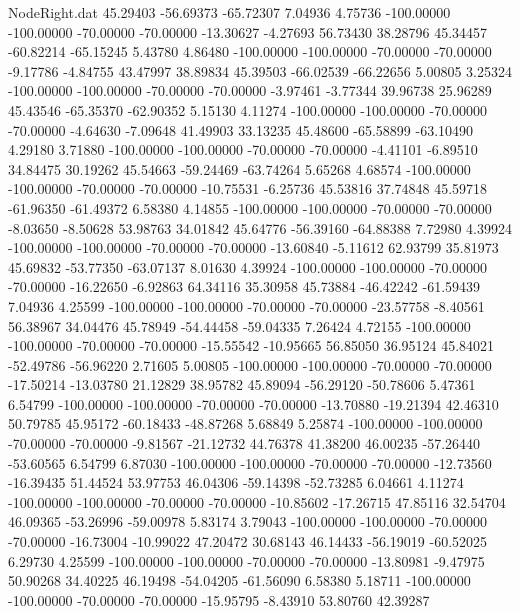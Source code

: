\begin{filecontents}{NodeRight.dat}
  45.29403  -56.69373  -65.72307     7.04936    4.75736 -100.00000 -100.00000  -70.00000  -70.00000  -13.30627   -4.27693   56.73430   38.28796
  45.34457  -60.82214  -65.15245     5.43780    4.86480 -100.00000 -100.00000  -70.00000  -70.00000   -9.17786   -4.84755   43.47997   38.89834
  45.39503  -66.02539  -66.22656     5.00805    3.25324 -100.00000 -100.00000  -70.00000  -70.00000   -3.97461   -3.77344   39.96738   25.96289
  45.43546  -65.35370  -62.90352     5.15130    4.11274 -100.00000 -100.00000  -70.00000  -70.00000   -4.64630   -7.09648   41.49903   33.13235
  45.48600  -65.58899  -63.10490     4.29180    3.71880 -100.00000 -100.00000  -70.00000  -70.00000   -4.41101   -6.89510   34.84475   30.19262
  45.54663  -59.24469  -63.74264     5.65268    4.68574 -100.00000 -100.00000  -70.00000  -70.00000  -10.75531   -6.25736   45.53816   37.74848
  45.59718  -61.96350  -61.49372     6.58380    4.14855 -100.00000 -100.00000  -70.00000  -70.00000   -8.03650   -8.50628   53.98763   34.01842
  45.64776  -56.39160  -64.88388     7.72980    4.39924 -100.00000 -100.00000  -70.00000  -70.00000  -13.60840   -5.11612   62.93799   35.81973
  45.69832  -53.77350  -63.07137     8.01630    4.39924 -100.00000 -100.00000  -70.00000  -70.00000  -16.22650   -6.92863   64.34116   35.30958
  45.73884  -46.42242  -61.59439     7.04936    4.25599 -100.00000 -100.00000  -70.00000  -70.00000  -23.57758   -8.40561   56.38967   34.04476
  45.78949  -54.44458  -59.04335     7.26424    4.72155 -100.00000 -100.00000  -70.00000  -70.00000  -15.55542  -10.95665   56.85050   36.95124
  45.84021  -52.49786  -56.96220     2.71605    5.00805 -100.00000 -100.00000  -70.00000  -70.00000  -17.50214  -13.03780   21.12829   38.95782
  45.89094  -56.29120  -50.78606     5.47361    6.54799 -100.00000 -100.00000  -70.00000  -70.00000  -13.70880  -19.21394   42.46310   50.79785
  45.95172  -60.18433  -48.87268     5.68849    5.25874 -100.00000 -100.00000  -70.00000  -70.00000   -9.81567  -21.12732   44.76378   41.38200
  46.00235  -57.26440  -53.60565     6.54799    6.87030 -100.00000 -100.00000  -70.00000  -70.00000  -12.73560  -16.39435   51.44524   53.97753
  46.04306  -59.14398  -52.73285     6.04661    4.11274 -100.00000 -100.00000  -70.00000  -70.00000  -10.85602  -17.26715   47.85116   32.54704
  46.09365  -53.26996  -59.00978     5.83174    3.79043 -100.00000 -100.00000  -70.00000  -70.00000  -16.73004  -10.99022   47.20472   30.68143
  46.14433  -56.19019  -60.52025     6.29730    4.25599 -100.00000 -100.00000  -70.00000  -70.00000  -13.80981   -9.47975   50.90268   34.40225
  46.19498  -54.04205  -61.56090     6.58380    5.18711 -100.00000 -100.00000  -70.00000  -70.00000  -15.95795   -8.43910   53.80760   42.39287

\end{filecontents}
